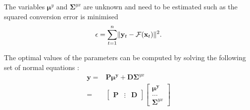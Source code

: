 The variables $\boldsymbol{\mu}^y$ and $\mathbf{\Sigma}^{yx}$ are unknown and need to be estimated such as the squared conversion error is minimised
\begin{equation}
	\label{eq:conversion_error}
	\epsilon=\sum_{t=1}^{n}\lVert\mathbf{y}_t - \mathcal{F}(\mathbf{x}_t)\rVert^2.
\end{equation}

The optimal values of the parameters can be computed by solving the following set of normal equations \cite{stylianou95}:
\begin{equation}
	\begin{split}
		\mathbf{y} = &\mathbf{P}\boldsymbol{\mu^y} + \mathbf{D}\mathbf{\Sigma}^{yx} \\
		= & \begin{bmatrix}
			\mathbf{P}& \vdots &\mathbf{D}
		\end{bmatrix}
		\begin{bmatrix}
			\boldsymbol{\mu^y} \\
			\dots \\
			\mathbf{\Sigma}^{yx}
		\end{bmatrix}
	\end{split}
\end{equation}
